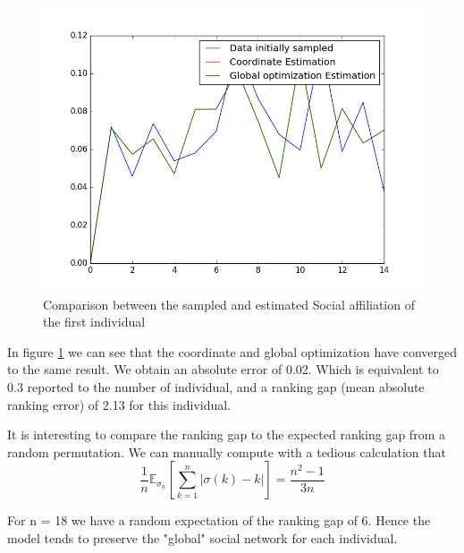 \documentclass[12pt]{ociamthesis}  %
\begin{document}
	\begin{figure}
		\centering
		\includegraphics[width=\textwidth,height=\textheight,keepaspectratio]{LambdaEstimation}
		\caption{Comparison between the sampled and estimated Social affiliation of the first individual}
		\label{label-image1}
	\end{figure}
	
	In figure \ref{label-image1} we can see that the coordinate and global optimization have converged to the same result. We obtain an absolute error of 0.02. Which is equivalent to 0.3 reported to the number of individual, and a ranking gap (mean absolute ranking error) of 2.13 for this individual.
	
	It is interesting to compare the ranking gap to the expected ranking gap from a random permutation. We can manually compute with a tedious calculation that
	\begingroup
	\large
	\begin{equation}
		\frac{1}{n} \mathbb{E}_{\mathbb{\sigma}_{n}}[ \sum_{k = 1}^{n} |\sigma(k) - k| ] = \frac{n^{2} - 1}{3n}
	\end{equation}
	\endgroup
	
	For n = 18 we have a random expectation of the ranking gap of 6. Hence the model tends to preserve the "global" social network for each individual.
	
\end{document}
